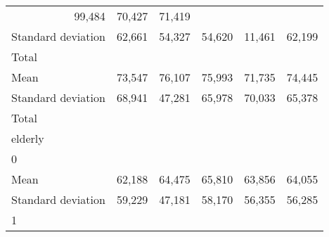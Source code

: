 \begin{tabular}{llllll}
  \multicolumn{1}{r}{99,484} &
  \multicolumn{1}{r}{70,427} &
  \multicolumn{1}{r}{71,419} \\
\multicolumn{1}{l}{\hspace{4em}Standard deviation} &
  \multicolumn{1}{|r}{62,661} &
  \multicolumn{1}{r}{54,327} &
  \multicolumn{1}{r}{54,620} &
  \multicolumn{1}{r}{11,461} &
  \multicolumn{1}{r}{62,199} \\
\multicolumn{1}{l}{\hspace{3em}Total} &
  \multicolumn{1}{|r}{} &
  \multicolumn{1}{r}{} &
  \multicolumn{1}{r}{} &
  \multicolumn{1}{r}{} &
  \multicolumn{1}{r}{} \\
\multicolumn{1}{l}{\hspace{4em}Mean} &
  \multicolumn{1}{|r}{73,547} &
  \multicolumn{1}{r}{76,107} &
  \multicolumn{1}{r}{75,993} &
  \multicolumn{1}{r}{71,735} &
  \multicolumn{1}{r}{74,445} \\
\multicolumn{1}{l}{\hspace{4em}Standard deviation} &
  \multicolumn{1}{|r}{68,941} &
  \multicolumn{1}{r}{47,281} &
  \multicolumn{1}{r}{65,978} &
  \multicolumn{1}{r}{70,033} &
  \multicolumn{1}{r}{65,378} \\
\multicolumn{1}{l}{\hspace{1em}Total} &
  \multicolumn{1}{|r}{} &
  \multicolumn{1}{r}{} &
  \multicolumn{1}{r}{} &
  \multicolumn{1}{r}{} &
  \multicolumn{1}{r}{} \\
\multicolumn{1}{l}{\hspace{2em}elderly} &
  \multicolumn{1}{|r}{} &
  \multicolumn{1}{r}{} &
  \multicolumn{1}{r}{} &
  \multicolumn{1}{r}{} &
  \multicolumn{1}{r}{} \\
\multicolumn{1}{l}{\hspace{3em}0} &
  \multicolumn{1}{|r}{} &
  \multicolumn{1}{r}{} &
  \multicolumn{1}{r}{} &
  \multicolumn{1}{r}{} &
  \multicolumn{1}{r}{} \\
\multicolumn{1}{l}{\hspace{4em}Mean} &
  \multicolumn{1}{|r}{62,188} &
  \multicolumn{1}{r}{64,475} &
  \multicolumn{1}{r}{65,810} &
  \multicolumn{1}{r}{63,856} &
  \multicolumn{1}{r}{64,055} \\
\multicolumn{1}{l}{\hspace{4em}Standard deviation} &
  \multicolumn{1}{|r}{59,229} &
  \multicolumn{1}{r}{47,181} &
  \multicolumn{1}{r}{58,170} &
  \multicolumn{1}{r}{56,355} &
  \multicolumn{1}{r}{56,285} \\
\multicolumn{1}{l}{\hspace{3em}1} &

\end{tabular}
